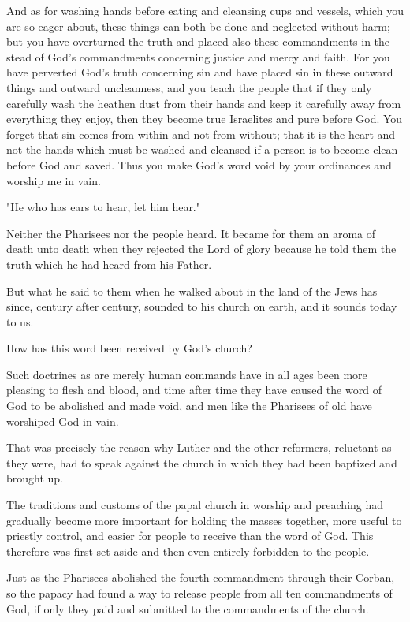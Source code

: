 And as for washing hands before eating and cleansing cups and vessels, which you are so eager about, these things can both be done and neglected without harm; but you have overturned the truth and placed also these commandments in the stead of God's commandments concerning justice and mercy and faith. For you have perverted God's truth concerning sin and have placed sin in these outward things and outward uncleanness, and you teach the people that if they only carefully wash the heathen dust from their hands and keep it carefully away from everything they enjoy, then they become true Israelites and pure before God. You forget that sin comes from within and not from without; that it is the heart and not the hands which must be washed and cleansed if a person is to become clean before God and saved. Thus you make God's word void by your ordinances and worship me in vain.

"He who has ears to hear, let him hear."

Neither the Pharisees nor the people heard. It became for them an aroma of death unto death when they rejected the Lord of glory because he told them the truth which he had heard from his Father.

But what he said to them when he walked about in the land of the Jews has since, century after century, sounded to his church on earth, and it sounds today to us.

How has this word been received by God's church?

Such doctrines as are merely human commands have in all ages been more pleasing to flesh and blood, and time after time they have caused the word of God to be abolished and made void, and men like the Pharisees of old have worshiped God in vain.

That was precisely the reason why Luther and the other reformers, reluctant as they were, had to speak against the church in which they had been baptized and brought up.

The traditions and customs of the papal church in worship and preaching had gradually become more important for holding the masses together, more useful to priestly control, and easier for people to receive than the word of God. This therefore was first set aside and then even entirely forbidden to the people.

Just as the Pharisees abolished the fourth commandment through their Corban, so the papacy had found a way to release people from all ten commandments of God, if only they paid and submitted to the commandments of the church.


